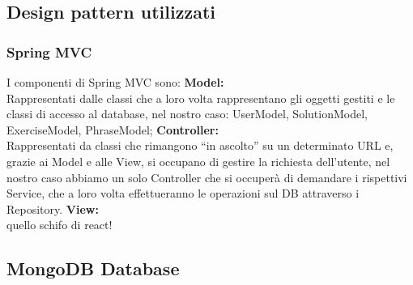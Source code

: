 \subsection{Design pattern utilizzati}
\subsubsection{Spring MVC}
I componenti di Spring MVC sono:
\textbf{Model:}\\
Rappresentati dalle classi che a loro volta rappresentano gli oggetti gestiti e le classi di accesso al database, nel nostro caso:
UserModel, SolutionModel, ExerciseModel, PhraseModel;
\textbf{Controller:}\\
Rappresentati da classi che rimangono “in ascolto” su un determinato URL e, grazie ai Model e alle View, si occupano di gestire la richiesta dell’utente, nel nostro caso abbiamo un solo Controller che si occuperà di demandare i rispettivi Service, che a loro volta effettueranno le operazioni sul DB attraverso i Repository.
\textbf{View:}\\ quello schifo di react!

\subsection{MongoDB Database}
